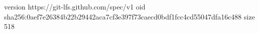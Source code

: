 version https://git-lfs.github.com/spec/v1
oid sha256:0aef7e26384b22b29442aca7cf3e397f73caecd0bdf1fcc4cd55047dfa16c488
size 518
